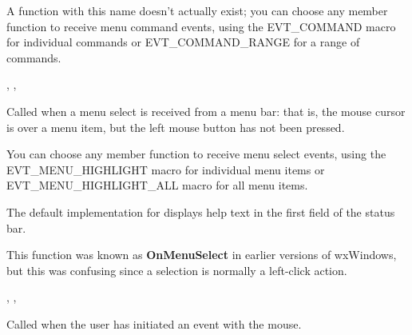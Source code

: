 
A function with this name doesn't actually exist; you can choose any member function to receive
menu command events, using the EVT\_COMMAND macro for individual commands or EVT\_COMMAND\_RANGE for
a range of commands.


,\rtfsp
{},\rtfsp
{}

\label{wxwindowonmenuhighlight}


Called when a menu select is received from a menu bar: that is, the
mouse cursor is over a menu item, but the left mouse button has not been
pressed.




You can choose any member function to receive
menu select events, using the EVT\_MENU\_HIGHLIGHT macro for individual menu items or EVT\_MENU\_HIGHLIGHT\_ALL macro
for all menu items.

The default implementation for  displays help
text in the first field of the status bar.

This function was known as {\bf OnMenuSelect} in earlier versions of wxWindows, but this was confusing
since a selection is normally a left-click action.


,\rtfsp
{},\rtfsp
{}


\label{wxwindowonmouseevent}


Called when the user has initiated an event with the
mouse.



